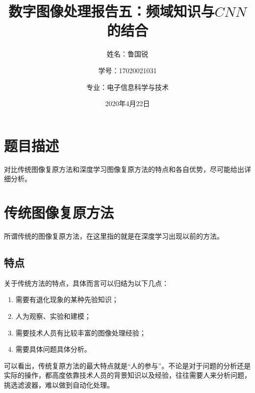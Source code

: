 \documentclass[UTF8]{ctexart}
\title{数字图像处理报告五：频域知识与$CNN$的结合}
\author{姓名：鲁国锐 \protect\newline
\and 学号：17020021031 \\
\and 专业：电子信息科学与技术}
\date{2020年4月22日}
\begin{document}
	\maketitle
	\renewcommand{\contentsname}{目录}
	\renewcommand{\listfigurename}{插图目录}
	\renewcommand{\listtablename}{表格目录}
	\renewcommand{\refname}{参考文献}
	\renewcommand{\abstractname}{摘要}
	\renewcommand{\indexname}{索引}
	\renewcommand{\tablename}{表}
	\renewcommand{\figurename}{图}
	
	
	
	\tableofcontents
	\newpage
	
	\hypersetup{
	bookmarks=true,
	colorlinks=true,
	linkcolor=red,
	urlcolor=blue
	}
	\section{题目描述}
	\indent 对比传统图像复原方法和深度学习图像复原方法的特点和各自优势，尽可能给出详细分析。

			
		


	
	\section{传统图像复原方法}\label{traditional_methods}
        \indent 所谓传统的图像复原方法，在这里指的就是在深度学习出现以前的方法。
        
        \subsection{特点}
            \indent 关于传统方法的特点，具体而言可以归结为以下几点：
    			
                \begin{enumerate}[leftmargin=50pt]
    				\item 需要有退化现象的某种先验知识\cite{digit_image_Gonzalez}；
    				\item 人为观察、实验和建模\cite{digit_image_Gonzalez}；
    				\item 需要技术人员有比较丰富的图像处理经验；
    				\item 需要具体问题具体分析。
    			\end{enumerate}                
            
            \indent 可以看出，传统复原方法的最大特点就是“人的参与”。不论是对于问题的分析还是实际的操作，都高度依靠技术人员的背景知识以及经验，往往需要人来分析问题，挑选滤波器，难以做到自动化处理。
            
\end{document}
